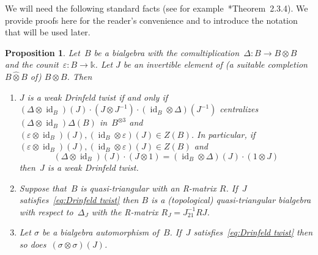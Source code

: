 \documentclass[12pt, reqno]{amsart}
\newcommand{\wh}[1]{\widehat{#1}}
\newtheorem{proposition}[theorem]{Proposition}
\theoremstyle{definition}
\numberwithin{equation}{section}
\newcommand{\tensor}{\otimes}
\newcommand{\kk}{\mathbb{k}}\newcommand{\lie}[1]{{\mathfrak{#1}}}
\newenvironment{enumalph}{\begin{enumerate}[label={\rm(\alph*)},leftmargin=*]}{\end{enumerate}}
\DeclareMathOperator{\id}{id}
\begin{document}
We will need the following standard facts (see for example~\cite{Majid}*{Theorem~2.3.4}). We provide proofs here for the reader's convenience
and to introduce the notation that will be used later.
\begin{proposition}\label{prop:Drinfeld twist}
Let~$B$ be a bialgebra with the comultiplication~$\Delta:B\to B\tensor B$ and the counit~$\varepsilon:B\to\kk$.
Let $J$ be an invertible element of (a suitable completion 
$B\wh\tensor B$ of) $B\tensor B$. Then
\begin{enumalph}
    \item \label{prop:Drinfeld twist.a} 
$J$ is a weak Drinfeld twist if and only if 
$(\Delta\tensor \id_B)(J)\cdot (J\tensor  J^{-1})\cdot (\id_B\tensor\Delta)(J^{-1})$
centralizes $(\Delta\tensor\id_B)\Delta(B)$
in~$B^{\tensor 3}$
and $(\varepsilon\tensor\id_B)(J),(\id_B\tensor\varepsilon)(J)\in Z(B)$.
In particular, if $(\varepsilon\tensor\id_B)(J),(\id_B\tensor\varepsilon)(J)\in Z(B)$ and 
\begin{equation}
(\Delta\tensor \id_B)(J)\cdot (J\tensor 1)=(\id_B\tensor\Delta)(J)\cdot (1\tensor J)
\label{eq:Drinfeld twist}    
\end{equation}
then~$J$ is a weak Drinfeld twist. 

\item\label{prop:Drinfeld twist.b} 
Suppose that~$B$ is quasi-triangular with an R-matrix $R$.
If~$J$ satisfies~\eqref{eq:Drinfeld twist} 
then $B$ is a (topological) quasi-triangular bialgebra with respect to~$\Delta_J$ with the R-matrix $R_J=J_{21}^{-1}RJ$.
\item\label{prop:Drinfeld twist.c}
Let $\sigma$ be a bialgebra automorphism of~$B$. If~$J$
satisfies~\eqref{eq:Drinfeld twist} then so does~$(\sigma\tensor\sigma)(J)$.
\end{enumalph}
\end{proposition}
\end{document}

